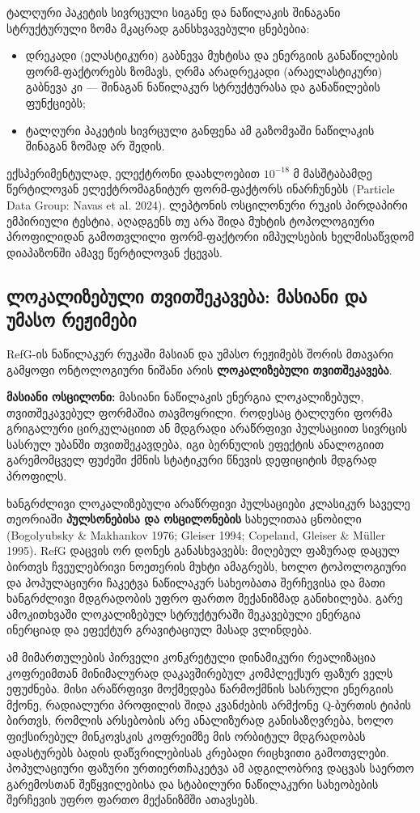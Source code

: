 \documentclass[11pt,a4paper]{article}
\begin{document}
ტალღური პაკეტის სივრცული სიგანე და ნაწილაკის შინაგანი სტრუქტურული ზომა მკაცრად განსხვავებული ცნებებია:

\begin{itemize}
\item დრეკადი (ელასტიკური) გაბნევა მუხტისა და ენერგიის განაწილების ფორმ-ფაქტორებს ზომავს, ღრმა არადრეკადი (არაელასტიკური) გაბნევა კი — შინაგან ნაწილაკურ სტრუქტურასა და განაწილების ფუნქციებს;
\item ტალღური პაკეტის სივრცული განფენა ამ გაზომვაში ნაწილაკის შინაგან ზომად არ შედის.

\end{itemize}
ექსპერიმენტულად, ელექტრონი დაახლოებით $10^{-18} \text{ მ}$ მასშტაბამდე წერტილოვან ელექტრომაგნიტურ ფორმ-ფაქტორს ინარჩუნებს (Particle Data Group: Navas et al. 2024). ლეპტონის ოსცილონური რუკის პირდაპირი ემპირიული ტესტია, აღადგენს თუ არა შიდა მუხტის ტოპოლოგიური პროფილიდან გამოთვლილი ფორმ-ფაქტორი იმპულსების ხელმისაწვდომ დიაპაზონში ამავე წერტილოვან ქცევას.


\subsection{ლოკალიზებული თვითშეკავება: მასიანი და უმასო რეჟიმები}

RefG-ის ნაწილაკურ რუკაში მასიან და უმასო რეჟიმებს შორის მთავარი გამყოფი ონტოლოგიური ნიშანი არის \textbf{ლოკალიზებული თვითშეკავება}.

\textbf{მასიანი ოსცილონი:} მასიანი ნაწილაკის ენერგია ლოკალიზებულ, თვითშეკავებულ ფორმაშია თავმოყრილი. როდესაც ტალღური ფორმა გრიგალური ცირკულაციით ან მდგრადი არაწრფივი პულსაციით სივრცის სასრულ უბანში თვითშეკავდება, იგი ბერნულის ეფექტის ანალოგიით გარემომცველ ფუძეში ქმნის სტატიკური წნევის დეფიციტის მდგრად პროფილს.

ხანგრძლივი ლოკალიზებული არაწრფივი პულსაციები კლასიკურ საველე თეორიაში \textbf{პულსონებისა და ოსცილონების} სახელითაა ცნობილი (Bogolyubsky \& Makhankov 1976; Gleiser 1994; Copeland, Gleiser \& Müller 1995). RefG დაცვის ორ დონეს განასხვავებს: მიღებულ ფაზურად დაცულ ბირთვს ჩვეულებრივი ნოეთერის მუხტი ამაგრებს, ხოლო ტოპოლოგიური და პოპულაციური ჩაკეტვა ნაწილაკურ სახეობათა შერჩევისა და მათი ხანგრძლივი მდგრადობის უფრო ფართო მექანიზმად განიხილება. გარე ამოკითხვაში ლოკალიზებულ სტრუქტურაში შეკავებული ენერგია ინერციად და ეფექტურ გრავიტაციულ მასად ვლინდება.

ამ მიმართულების პირველი კონკრეტული დინამიკური რეალიზაცია კოფრეიმთან მინიმალურად დაკავშირებულ კომპლექსურ ფაზურ ველს ეფუძნება. მისი არაწრფივი მოქმედება წარმოქმნის სასრული ენერგიის მქონე, რადიალური პროფილის შიდა კვანძების არმქონე Q-ბურთის ტიპის ბირთვს, რომლის არსებობის არე ანალიზურად განისაზღვრება, ხოლო ფიქსირებულ მინკოვსკის კოფრეიმზე მის ორბიტულ მდგრადობას ადასტურებს ბადის დაწვრილებისას კრებადი რიცხვითი გამოთვლები. პოპულაციური ფაზური ურთიერთჩაკეტვა ამ ადგილობრივ დაცვას საერთო გარემოსთან შეწყვილებისა და სტაბილური ნაწილაკური სახეობების შერჩევის უფრო ფართო მექანიზმში ათავსებს.
\end{document}
